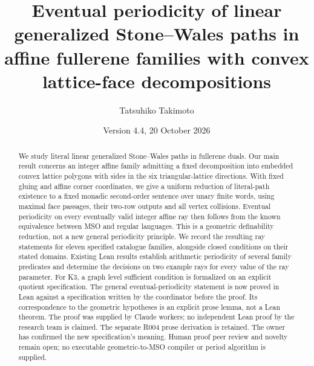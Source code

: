 \documentclass[11pt]{amsart}
\title[Affine fullerene families and eventual periodicity]{Eventual periodicity of linear generalized Stone--Wales paths in affine fullerene families with convex lattice-face decompositions}
\author{Tatsuhiko Takimoto}
\date{Version 4.4, 20 October 2026}
\theoremstyle{definition}\newtheorem{definition}{Definition}
\begin{document}
\begin{abstract}
We study literal linear generalized Stone--Wales paths in fullerene
duals. Our main result concerns an integer affine family admitting a
fixed decomposition into embedded convex lattice polygons with sides
in the six triangular-lattice directions. With fixed gluing and affine
corner coordinates, we give a uniform reduction of literal-path
existence to a fixed monadic second-order sentence over unary finite
words, using maximal face passages, their two-row outputs and all
vertex collisions. Eventual periodicity on every eventually valid
integer affine ray then follows from the known equivalence between
MSO and regular languages. This is a geometric definability reduction,
not a new general periodicity principle. We record
the resulting ray statements for eleven specified catalogue families,
alongside closed conditions on their stated domains. Existing Lean
results establish arithmetic periodicity of several family predicates
and determine the decisions on two example rays for every value of the ray parameter. For K3, a graph
level sufficient condition is formalized on an explicit quotient
specification. The general eventual-periodicity statement is now proved
in Lean against a specification written by the coordinator before the
proof. Its correspondence to the geometric hypotheses is an explicit
prose lemma, not a Lean theorem. The proof was supplied by Claude
workers; no independent Lean proof by the research team is claimed.
The separate R004 prose derivation is retained. The owner has confirmed
the new specification's meaning. Human proof peer review and novelty remain open;
no executable geometric-to-MSO compiler or period algorithm is supplied.
\end{abstract}
\maketitle
\end{document}
